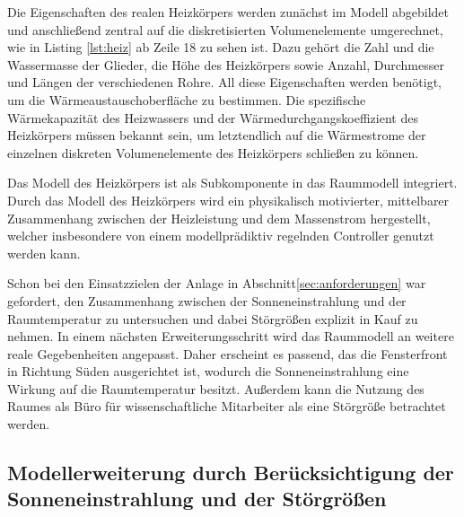 Die Eigenschaften des realen Heizkörpers werden zunächst im Modell abgebildet und anschließend zentral auf die diskretisierten Volumenelemente umgerechnet, wie in Listing \ref{lst:heiz} ab Zeile 18 zu sehen ist. Dazu gehört die Zahl und die Wassermasse der Glieder, die Höhe des Heizkörpers sowie Anzahl, Durchmesser und Längen der verschiedenen Rohre. All diese Eigenschaften werden benötigt, um die Wärmeaustauschoberfläche zu bestimmen. Die spezifische Wärmekapazität des Heizwassers und der Wärmedurchgangskoeffizient des Heizkörpers müssen bekannt sein, um letztendlich auf die Wärmestrome der einzelnen diskreten Volumenelemente des Heizkörpers schließen zu können.



Das Modell des Heizkörpers ist als Subkomponente in das Raummodell integriert. Durch das Modell des Heizkörpers wird ein physikalisch motivierter, mittelbarer Zusammenhang zwischen der Heizleistung und dem Massenstrom hergestellt, welcher insbesondere von einem modellprädiktiv regelnden Controller genutzt werden kann.

Schon bei den Einsatzzielen der Anlage in Abschnitt\ref{sec:anforderungen} war gefordert, den Zusammenhang zwischen der Sonneneinstrahlung und der Raumtemperatur zu untersuchen und dabei Störgrößen explizit in Kauf zu nehmen. In einem nächsten Erweiterungsschritt wird das Raummodell an weitere reale Gegebenheiten angepasst. Daher erscheint es passend, das die Fensterfront in Richtung Süden ausgerichtet ist, wodurch die Sonneneinstrahlung eine Wirkung auf die Raumtemperatur besitzt. Außerdem kann die Nutzung des Raumes als Büro für wissenschaftliche Mitarbeiter als eine Störgröße betrachtet werden.

\subsection{Modellerweiterung durch Berücksichtigung der Sonneneinstrahlung und der Störgrößen}
\label{sub:modsonne}


